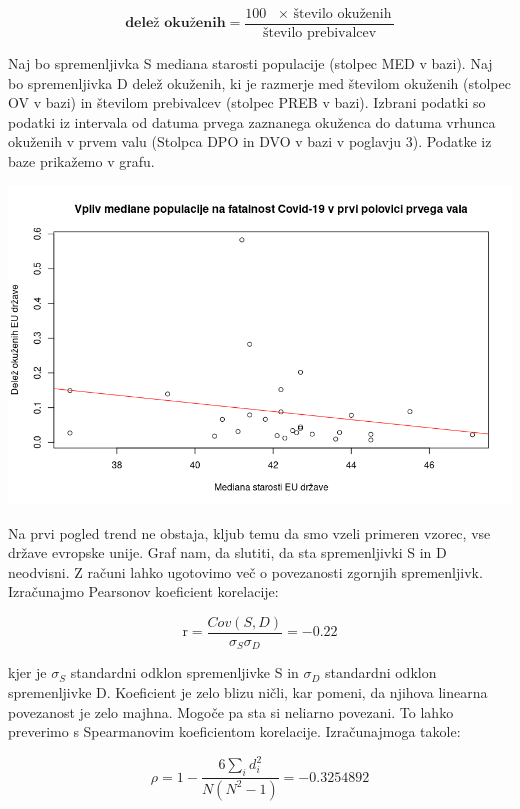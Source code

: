 \documentclass[a4paper,11pt]{article}
\begin{document}
\begin{center}
\[\textbf{delež okuženih} = \frac{100 \text{ \(\times\) število okuženih}}{\text{število prebivalcev}}\]
\end{center} 
Naj bo spremenljivka S mediana starosti populacije (stolpec MED v bazi). Naj bo spremenljivka D delež okuženih, ki je razmerje med številom okuženih (stolpec OV v bazi) in številom prebivalcev (stolpec PREB v bazi). Izbrani podatki so podatki iz intervala od datuma prvega zaznanega okuženca do datuma vrhunca okuženih v prvem valu (Stolpca DPO in DVO v bazi v poglavju 3). Podatke iz baze prikažemo v grafu. 

\includegraphics[scale=0.6]{Vpliv_mediane_populacije_na_delez_okuzenih_v_prvi_polovici_prvega_vala}

Na prvi pogled trend ne obstaja, kljub temu da smo vzeli primeren vzorec, vse države evropske unije. Graf nam, da slutiti, da sta spremenljivki S in D neodvisni. Z računi lahko ugotovimo več o povezanosti zgornjih spremenljivk. Izračunajmo Pearsonov koeficient korelacije:

\begin{center}
\[\text{r} = \frac{Cov(S,D)}{\sigma_{S} \sigma_{D}} = -0.22\]
\end{center} 

kjer je \(\sigma_{S}\) standardni odklon spremenljivke S in \(\sigma_{D}\) standardni odklon spremenljivke D. Koeficient je zelo blizu ničli, kar pomeni, da njihova linearna povezanost je zelo majhna. Mogoče pa sta si neliarno povezani. To lahko preverimo s Spearmanovim koeficientom korelacije. Izračunajmoga takole: 

\begin{center}
\[\rho = 1 - \frac{6\sum_{i}{}d_i^2}{N(N^2 - 1)} = -0.3254892\]
\end{center} 
\end{document}

